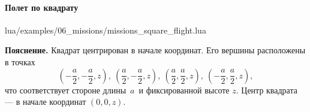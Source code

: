 \paragraph{Полет по квадрату}
\begin{codefile}{lua/examples/06_missions/missions_square_flight.lua}
\end{codefile}
\textbf{Пояснение.} Квадрат центрирован в начале координат. Его вершины расположены в точках
\[
  \left(-\frac{a}{2}, -\frac{a}{2}, z\right),\ \left(\frac{a}{2}, -\frac{a}{2}, z\right),\ \left(\frac{a}{2}, \frac{a}{2}, z\right),\ \left(-\frac{a}{2}, \frac{a}{2}, z\right),
\]
что соответствует стороне длины \(\,a\,\) и фиксированной высоте \(z\). Центр квадрата — в начале координат \((0,0,z)\).
